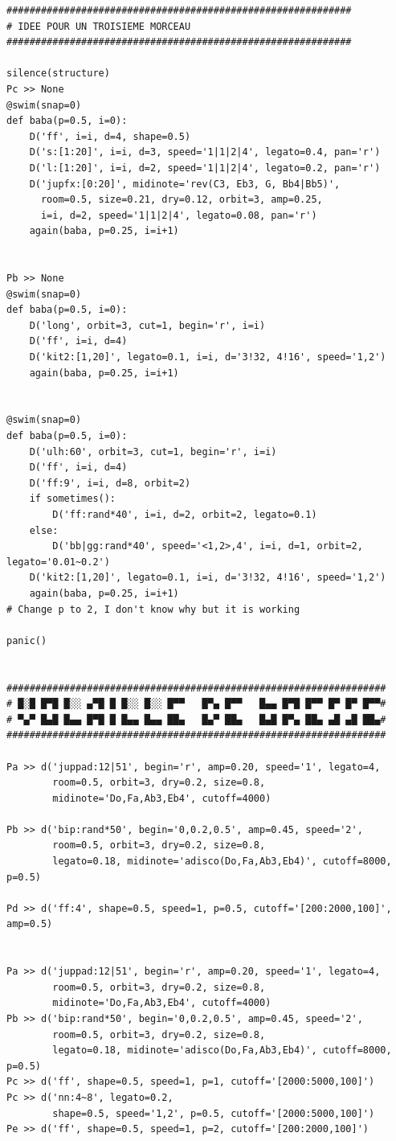 \documentclass[11pt]{article}
\begin{document}
\begin{enumerate}
\begin{verbatim}
############################################################
# IDEE POUR UN TROISIEME MORCEAU
############################################################

silence(structure)
Pc >> None
@swim(snap=0)
def baba(p=0.5, i=0):
    D('ff', i=i, d=4, shape=0.5)
    D('s:[1:20]', i=i, d=3, speed='1|1|2|4', legato=0.4, pan='r')
    D('l:[1:20]', i=i, d=2, speed='1|1|2|4', legato=0.2, pan='r')
    D('jupfx:[0:20]', midinote='rev(C3, Eb3, G, Bb4|Bb5)',
      room=0.5, size=0.21, dry=0.12, orbit=3, amp=0.25,
      i=i, d=2, speed='1|1|2|4', legato=0.08, pan='r')
    again(baba, p=0.25, i=i+1)


Pb >> None
@swim(snap=0)
def baba(p=0.5, i=0):
    D('long', orbit=3, cut=1, begin='r', i=i)
    D('ff', i=i, d=4)
    D('kit2:[1,20]', legato=0.1, i=i, d='3!32, 4!16', speed='1,2')
    again(baba, p=0.25, i=i+1)


@swim(snap=0)
def baba(p=0.5, i=0):
    D('ulh:60', orbit=3, cut=1, begin='r', i=i)
    D('ff', i=i, d=4)
    D('ff:9', i=i, d=8, orbit=2)
    if sometimes():
        D('ff:rand*40', i=i, d=2, orbit=2, legato=0.1)
    else:
        D('bb|gg:rand*40', speed='<1,2>,4', i=i, d=1, orbit=2, legato='0.01~0.2')
    D('kit2:[1,20]', legato=0.1, i=i, d='3!32, 4!16', speed='1,2')
    again(baba, p=0.25, i=i+1)
# Change p to 2, I don't know why but it is working

panic()


##################################################################
# █░█ █▀█ █░░ ▄▀█ █ █░░ █░░ █▀▀   █▀▄ █▀▀   █▄▄ █▀█ █▀▀ █▀ █▀ █▀▀#
# ▀▄▀ █▄█ █▄▄ █▀█ █ █▄▄ █▄▄ ██▄   █▄▀ ██▄   █▄█ █▀▄ ██▄ ▄█ ▄█ ██▄#
##################################################################

Pa >> d('juppad:12|51', begin='r', amp=0.20, speed='1', legato=4,
        room=0.5, orbit=3, dry=0.2, size=0.8,
        midinote='Do,Fa,Ab3,Eb4', cutoff=4000)

Pb >> d('bip:rand*50', begin='0,0.2,0.5', amp=0.45, speed='2',
        room=0.5, orbit=3, dry=0.2, size=0.8,
        legato=0.18, midinote='adisco(Do,Fa,Ab3,Eb4)', cutoff=8000, p=0.5)

Pd >> d('ff:4', shape=0.5, speed=1, p=0.5, cutoff='[200:2000,100]', amp=0.5)


Pa >> d('juppad:12|51', begin='r', amp=0.20, speed='1', legato=4,
        room=0.5, orbit=3, dry=0.2, size=0.8,
        midinote='Do,Fa,Ab3,Eb4', cutoff=4000)
Pb >> d('bip:rand*50', begin='0,0.2,0.5', amp=0.45, speed='2',
        room=0.5, orbit=3, dry=0.2, size=0.8,
        legato=0.18, midinote='adisco(Do,Fa,Ab3,Eb4)', cutoff=8000, p=0.5)
Pc >> d('ff', shape=0.5, speed=1, p=1, cutoff='[2000:5000,100]')
Pc >> d('nn:4~8', legato=0.2,
        shape=0.5, speed='1,2', p=0.5, cutoff='[2000:5000,100]')
Pe >> d('ff', shape=0.5, speed=1, p=2, cutoff='[200:2000,100]')


\end{verbatim}
\end{enumerate}
\end{document}
